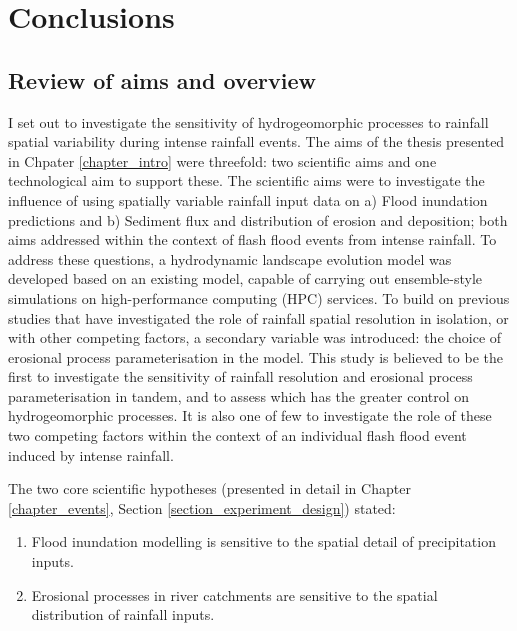 \chapter{Conclusions}
\label{chapter_conclusion}

\section{Review of aims and overview}

I set out to investigate the sensitivity of hydrogeomorphic processes to rainfall spatial variability during intense rainfall events. The aims of the thesis presented in Chpater \ref{chapter_intro} were threefold: two scientific aims and one technological aim to support these. The scientific aims were to investigate the influence of using spatially variable rainfall input data on a) Flood inundation predictions and b) Sediment flux and distribution of erosion and deposition; both aims addressed within the context of flash flood events from intense rainfall. To address these questions, a hydrodynamic landscape evolution model was developed based on an existing model, capable of carrying out ensemble-style simulations on high-performance computing (HPC) services. To build on previous studies that have investigated the role of rainfall spatial resolution in isolation, or with other competing factors, a secondary variable was introduced: the choice of erosional process parameterisation in the model. This study is believed to be the first to investigate the sensitivity of rainfall resolution and erosional process parameterisation in tandem, and to assess which has the greater control on hydrogeomorphic processes. It is also one of few to investigate the role of these two competing factors within the context of an individual flash flood event induced by intense rainfall. 

The two core scientific hypotheses (presented in detail in Chapter \ref{chapter_events}, Section \ref{section_experiment_design}) stated:

\begin{enumerate}
\item Flood inundation modelling is sensitive to the spatial detail of precipitation inputs.
\item Erosional processes in river catchments are sensitive to the spatial distribution of rainfall inputs.
\end{enumerate}

